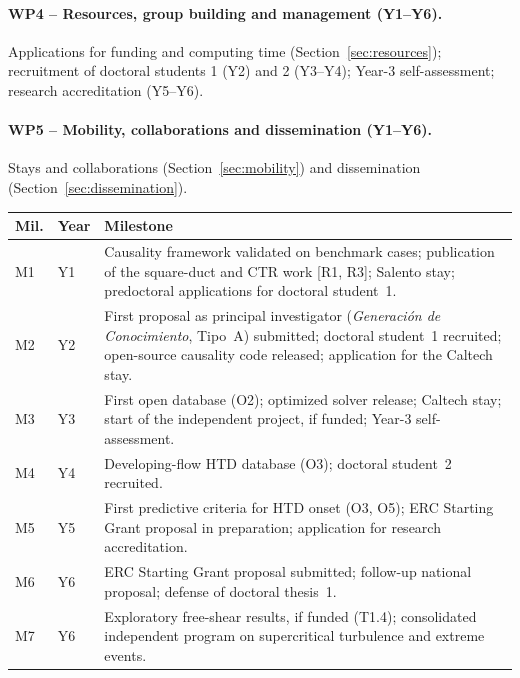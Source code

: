 \documentclass[11pt]{article}
\begin{document}
\paragraph{WP4 -- Resources, group building and management (Y1--Y6).} Applications for
funding and computing time (Section~\ref{sec:resources}); recruitment of doctoral students
1 (Y2) and 2 (Y3--Y4); Year-3 self-assessment; research accreditation (Y5--Y6).

\paragraph{WP5 -- Mobility, collaborations and dissemination (Y1--Y6).} Stays and
collaborations (Section~\ref{sec:mobility}) and dissemination
(Section~\ref{sec:dissemination}).

\begin{center}\small
\begin{tabularx}{\textwidth}{@{}p{0.8cm}p{1.35cm}X@{}}
\toprule
\textbf{Mil.} & \textbf{Year} & \textbf{Milestone} \\
\midrule
M1 & Y1 & Causality framework validated on benchmark cases; publication of the square-duct and CTR work [R1, R3]; Salento stay; predoctoral applications for doctoral student~1. \\
M2 & Y2 & First proposal as principal investigator (\emph{Generaci\'on de Conocimiento}, Tipo~A) submitted; doctoral student~1 recruited; open-source causality code released; application for the Caltech stay. \\
M3 & Y3 & First open database (O2); optimized solver release; Caltech stay; start of the independent project, if funded; Year-3 self-assessment. \\
M4 & Y4 & Developing-flow HTD database (O3); doctoral student~2 recruited. \\
M5 & Y5 & First predictive criteria for HTD onset (O3, O5); ERC Starting Grant proposal in preparation; application for research accreditation. \\
M6 & Y6 & ERC Starting Grant proposal submitted; follow-up national proposal; defense of doctoral thesis~1. \\
M7 & Y6 & Exploratory free-shear results, if funded (T1.4); consolidated independent program on supercritical turbulence and extreme events. \\
\bottomrule
\end{tabularx}
\end{center}
\end{document}
